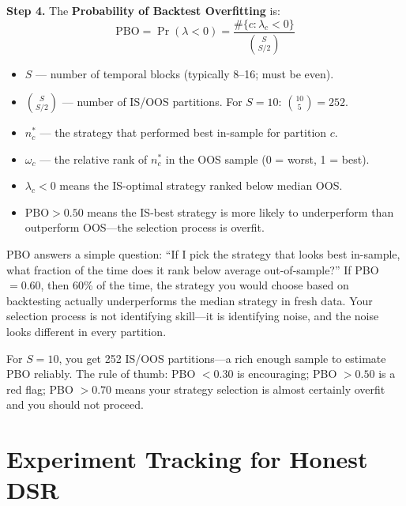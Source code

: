 \begin{definition}
\textbf{Step 4.} The \textbf{Probability of Backtest Overfitting} is:
\begin{equation}
\text{PBO} = \Pr(\lambda < 0) = \frac{\#\{c : \lambda_c < 0\}}{\binom{S}{S/2}}
\label{eq:pbo}
\end{equation}
\begin{itemize}[nosep]
  \item $S$ --- number of temporal blocks (typically 8--16; must be even).
  \item $\binom{S}{S/2}$ --- number of IS/OOS partitions. For $S = 10$: $\binom{10}{5} = 252$.
  \item $n^*_c$ --- the strategy that performed best in-sample for partition $c$.
  \item $\omega_c$ --- the relative rank of $n^*_c$ in the OOS sample (0 = worst, 1 = best).
  \item $\lambda_c < 0$ means the IS-optimal strategy ranked below median OOS.
  \item $\text{PBO} > 0.50$ means the IS-best strategy is more likely to underperform than outperform OOS---the selection process is overfit.
\end{itemize}
\end{definition}

\begin{intuition}
PBO answers a simple question: ``If I pick the strategy that looks best in-sample, what fraction of the time does it rank below average out-of-sample?'' If PBO $= 0.60$, then 60\% of the time, the strategy you would choose based on backtesting actually underperforms the median strategy in fresh data. Your selection process is not identifying skill---it is identifying noise, and the noise looks different in every partition.
\end{intuition}

For $S = 10$, you get 252 IS/OOS partitions---a rich enough sample to estimate PBO reliably. The rule of thumb: PBO $< 0.30$ is encouraging; PBO $> 0.50$ is a red flag; PBO $> 0.70$ means your strategy selection is almost certainly overfit and you should not proceed.

\section{Experiment Tracking for Honest DSR}
\label{sec:experiment-tracking}

